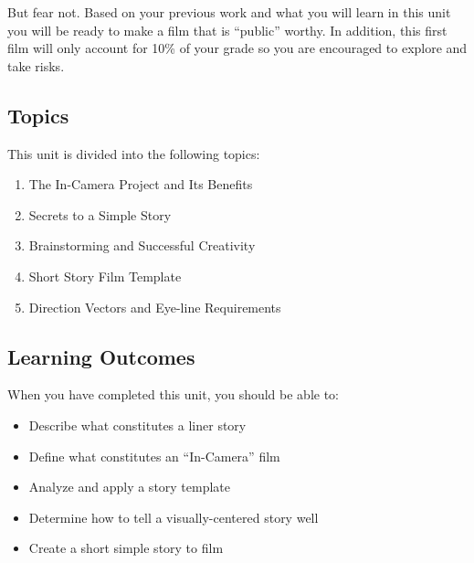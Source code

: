 \documentclass[
]{book}
\providecommand{\tightlist}{%
  \setlength{\itemsep}{0pt}\setlength{\parskip}{0pt}}
\begin{document}
But fear not. Based on your previous work and what you will learn in this unit you will be ready to make a film that is ``public'' worthy. In addition, this first film will only account for 10\% of your grade so you are encouraged to explore and take risks.

\hypertarget{topics-5}{%
\subsection*{Topics}\label{topics-5}}

This unit is divided into the following topics:

\begin{enumerate}
\def\labelenumi{\arabic{enumi}.}
\tightlist
\item
  The In-Camera Project and Its Benefits\\
\item
  Secrets to a Simple Story\\
\item
  Brainstorming and Successful Creativity\\
\item
  Short Story Film Template\\
\item
  Direction Vectors and Eye-line Requirements
\end{enumerate}

\hypertarget{learning-outcomes-5}{%
\subsection*{Learning Outcomes}\label{learning-outcomes-5}}

When you have completed this unit, you should be able to:

\begin{itemize}
\tightlist
\item
  Describe what constitutes a liner story\\
\item
  Define what constitutes an ``In-Camera'' film\\
\item
  Analyze and apply a story template\\
\item
  Determine how to tell a visually-centered story well\\
\item
  Create a short simple story to film
\end{itemize}
\end{document}
